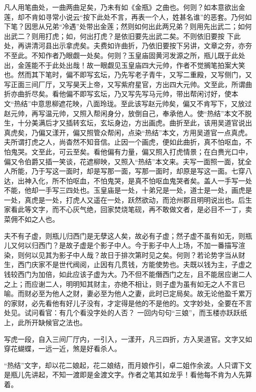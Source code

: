 \begin{showcontents}{}
{凡人用笔曲处，一曲两曲足矣，乃未有如《金瓶》之曲也。何则？如本意欲出金莲，却不肯如寻常小说云“按下此处不言，再表一个人，姓甚名谁”的恶套。乃何如下笔？因思从兄弟“冷遇”处带出金莲；然则如何出此两兄弟？则用先出武二；如何出武二？则用打虎；如，何出打虎？是依旧要先出武二矣。不则依旧要按
下此处，再讲清河县出示拿虎矣。夫费如许曲折，乃依旧要按下另讲，文章之夯，亦夯不至此。不知作者乃眼觑一处矣。何则？玉皇庙固黄河发源之所，瓶儿既于此处出，金莲能不于此处出哉！故一眼觑见玉皇庙四大元帅，作者不觉搁笔拍案大笑也。然而其下笔时，偏不即写玄坛，乃先写老子青牛，又写二重殿，又写侧门，又写正面三间厂厅，又写昊天上帝，又写紫府星官，方出四大元帅。文至此，所谓曲折亦曲折尽矣。看他偏不即写玄坛，乃又写先写马元帅，带出帮闲讨好，使本文“热结”中意思柳遮花映，八面玲珑。至此该写赵元帅矣，偏又不肯写下，又放过赵元帅，再写温元帅，又照入帮闲身分，放倒自己，奉承他人。使“热结”本文不脱生，十分美满后才又插转玄坛，玄坛身边，方出画虎。曲折至此，该用吴道官说出真虎矣，乃偏又漾开，偏又照管众帮闲，点染“热结”本文，方用吴道官一点真虎。夫所谓打虎之人，尚杳然不知音信。止因一个画虎，便如此曲折，真不怕呕血，不怕鬼哭。文至此，可云至矣。看他偏有力量，偏又照入打虎情景；在白赉光口中，偏又令伯爵又插一笑谈，花遮柳映，又照入“热结”本文来。夫写一面照一面，犹全人所能，乃于写这一面时，却是写那一面，写那一面时，却原是写这一面。七穿八达，出神入化，所不怕呕血，不怕鬼哭，是真不怕呕血鬼哭者矣。盖人一手写一处不能，他却一手写三四处也。玉皇庙是一处，十弟兄是一处，道士是一处，画虎是一处，真虎是一处，打虎人又遥在一处，跃然欲动，而沧州郡且明明说出也。后生家看此等文字，而不心灰气绝，回家焚烧笔砚，再不敢做文者，是必目不一丁，卖菜佣不如之人也。

夫不有子虚，则瓶儿归西门是无孽这人矣，故必有子虚；然子虚不虽有如无，则瓶儿又何以归西门？是故子虚是个影子中人。今于影子中人上场，不加一番描写渲染，则何以见其为影子中人哉？故日于排次第时见之矣。何则？若论势字当从财生，西门庆家不是世代阀阅，止因有几贯钱，方能使势也。夫既以钱为主，子虚之钱较西门为加倍，如此应该子虚为大。乃不但不能僭西门之左，且不能居应谢二人之上；而应谢二人，明明知其财主，亦绝不相让，则子虚为虽有如无之人不言已喻。而财必至为他人之财，妻必至为他人之妻，此时已定局矣。故无论他盈千累万的家财，必先看他有好儿子没有，才定得是他的不是他的。文字妙处，全要在不言处见。试问看官：有几个看没字处的人否？
一回内句句“三娘”，而玉楼亦跃跃纸上，此所开缺候官之法也。

写虎一段，自入三间厂厅内，一引入，一漾开，凡三四折，方入吴道官。文字又如穿花蝴蝶，一远一近，煞是好看杀人。

“热结”文字，却以花二娘起，花二娘结，而月娘作引，卓二姐作余波。人只谓下文是瓶儿先讲起，不知一渡即是金渡文字。作者之笔其如龙乎！看他每不肯为人先算着。

}
\end{showcontents}
